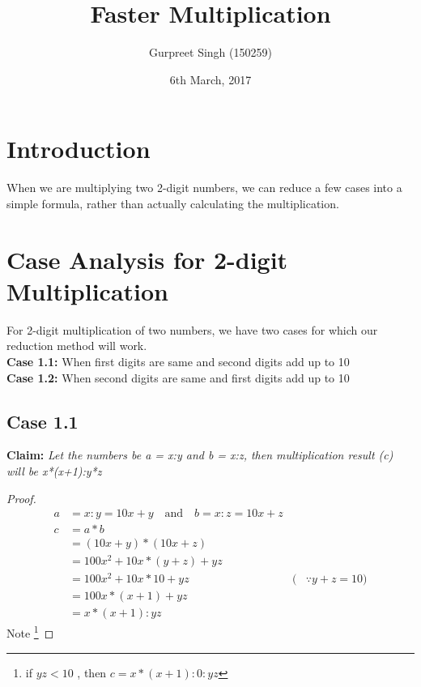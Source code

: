 \documentclass{article}
\title{Faster Multiplication}
\author{Gurpreet Singh (150259)}
\date{6th March, 2017}
\begin{document}
\maketitle

\section*{Introduction}

    When we are multiplying two 2-digit numbers, we can reduce a few cases into a simple formula, rather than actually calculating the multiplication.
    
\section*{Case Analysis for 2-digit Multiplication}

    For 2-digit multiplication of two numbers, we have two cases for which our reduction method will work. \cite{atul}\\
    
    \textbf{Case 1.1: } When first digits are same and second digits add up to 10 \\
    
    \textbf{Case 1.2: } When second digits are same and first digits add up to 10

    \newpage

    \subsection*{Case 1.1}
    
        \textbf{Claim:} \emph{Let the numbers be a = x:y and b = x:z, then multiplication result (c) will be x*(x+1):y*z}
        \begin{proof}
            \begin{align*}
                a &= x:y = 10x + y \quad \textrm{and} \quad b = x:z = 10x + z\\
                c &= a*b \\
                &= (10x + y) * (10x + z) \\
                &= 100x^{2} + 10x * (y+z) + yz\\
                &= 100x^{2} + 10x * 10 + yz &(&\because y+z = 10)\\
                &= 100x*(x+1) + yz \\
                &= x*(x+1):yz
            \end{align*}            
            Note \footnote[1]{if $yz < 10$ , then $c = x*(x+1):0:yz$}
        \end{proof}
        
\end{document}
